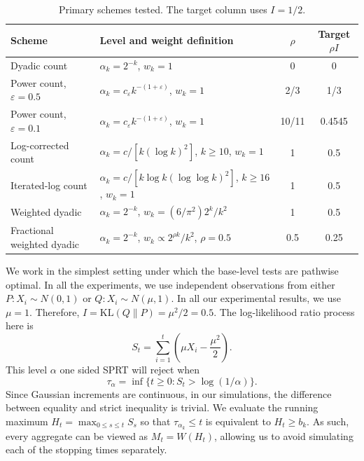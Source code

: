 \documentclass{article}
\newcommand{\KL}{\mathrm{KL}}
\theoremstyle{definition}
\begin{document}
\begin{table}[h]
\centering
\caption{Primary schemes tested. The target column uses $I=1/2$.}
\label{tab:schemes}
\begin{tabularx}{\textwidth}{@{}lXcc@{}}
\toprule
Scheme & Level and weight definition & \(\rho\) & Target \(\rho I\) \\
\midrule
Dyadic count & \(\alpha_k=2^{-k}\), \(w_k=1\) & 0 & 0 \\
Power count, \(\varepsilon=0.5\) & \(\alpha_k=c_{\varepsilon}k^{-(1+\varepsilon)}\), \(w_k=1\) & 2/3 & 1/3 \\
Power count, \(\varepsilon=0.1\) & \(\alpha_k=c_{\varepsilon}k^{-(1+\varepsilon)}\), \(w_k=1\) & 10/11 & 0.4545 \\
Log-corrected count & \(\alpha_k=c/[k(\log k)^2]\), \(k\ge 10\), \(w_k=1\) & 1 & 0.5 \\
Iterated-log count & \(\alpha_k=c/[k\log k(\log\log k)^2]\), \(k\ge 16\), \(w_k=1\) & 1 & 0.5 \\
Weighted dyadic & \(\alpha_k=2^{-k}\), \(w_k=(6/\pi^2)2^k/k^2\) & 1 & 0.5 \\
Fractional weighted dyadic & \(\alpha_k=2^{-k}\), \(w_k\propto 2^{\rho k}/k^2\), \(\rho=0.5\) & 0.5 & 0.25 \\
\bottomrule
\end{tabularx}
\end{table}

We work in the simplest setting under which the base-level tests are pathwise optimal. In all the experiments, we use independent observations from either $P:X_i\sim N(0,1)$ or $Q:X_i\sim N(\mu, 1)$. In all our experimental results, we use $\mu=1$. Therefore, $I=\KL(Q\|P)=\mu^2/2=0.5$. The log-likelihood ratio process here is
\[
S_t=\sum_{i=1}^t \left(\mu X_i - \frac{\mu^2}{2}\right).
\]
This level $\alpha$ one sided SPRT will reject when
\[
\tau_{\alpha}=\inf\{t\ge 0: S_t> \log(1/\alpha)\}.
\]
Since Gaussian increments are continuous, in our simulations, the difference between equality and strict inequality is trivial. We evaluate the running maximum $H_t=\max_{0\le s\le t} S_s$ so that $\tau_{\alpha_k}\le t$ is equivalent to $H_t\ge b_k$. As such, every aggregate can be viewed as $M_t=W(H_t)$, allowing us to avoid simulating each of the stopping times separately.
\end{document}
